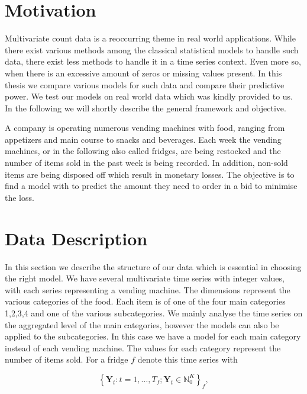 \section{Motivation}
\label{sec:Motivation}

Multivariate count data is a reoccurring theme in real world applications. While there exist various methods among the classical statistical models to handle such data, there exist less methods to handle it in a time series context. Even more so, when there is an excessive amount of zeros or missing values present. In this thesis we compare various models for such data and compare their predictive power. We test our models on real world data which was kindly provided to us. In the following we will shortly describe the general framework and objective. 

A company is operating numerous vending machines with food, ranging from appetizers and main course to snacks and beverages. Each week the vending machines, or in the following also called fridges, are being restocked and the number of items sold in the past week is being recorded. In addition, non-sold items are being disposed off which result in monetary losses. The objective is to find a model with to predict the amount they need to order in a bid to minimise the loss.

\section{Data Description}
\label{sec: Data Description}

In this section we describe the structure of our data which is essential in choosing the right model. We have several multivariate time series with integer values, with each series representing a vending machine. The dimensions represent the various categories of the food. Each item is of one of the four main categories 1,2,3,4 and one of the various subcategories. We mainly analyse the time series on the aggregated level of the main categories, however the models can also be applied to the subcategories. In this case we have a model for each main category instead of each vending machine. The values for each category represent the number of items sold. For a fridge $f$ denote this time series with 

\begin{equation}
\left\{\bm{Y}_t:t=1,\ldots,T_f; \bm{Y}_t \in \mathbb{N}_0^K \right\}_f,
\label{eq:time series definition}
\end{equation}

